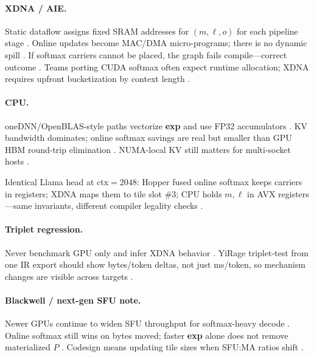 \paragraph{XDNA / AIE.} Static dataflow assigns fixed SRAM addresses for $(m,\ell,o)$ for each pipeline stage \citep{amd2024aie,amd2024xdna}. Online updates become MAC/DMA micro-programs; there is no dynamic spill \citep{yirage2026,chen2020compilerbasedhardw}. If softmax carriers cannot be placed, the graph fails compile---correct outcome \citep{amd2024aie,memoryfloor2026}. Teams porting CUDA softmax often expect runtime allocation; XDNA requires upfront bucketization by context length \citep{kwon2023vllm,amd2024xdna}.

\paragraph{CPU.} oneDNN/OpenBLAS-style paths vectorize \textbf{exp} and use FP32 accumulators \citep{dlbook}. KV bandwidth dominates; online softmax savings are real but smaller than GPU HBM round-trip elimination \citep{patel2025llminference,memoryfloor2026}. NUMA-local KV still matters for multi-socket hosts \citep{kwon2023vllm,dlbook}.

\begin{example}
Identical Llama head at ctx${=}2048$: Hopper fused online softmax keeps carriers in registers; XDNA maps them to tile slot \#3; CPU holds $m,\ell$ in AVX registers---same invariants, different compiler legality checks \citep{amd2024xdna,semianalysis2024tma,dlbook,yirage2026}.
\end{example}

\paragraph{Triplet regression.} Never benchmark GPU only and infer XDNA behavior \citep{amd2024aie,patel2025llminference}. YiRage triplet-test from one IR export should show bytes/token deltas, not just ms/token, so mechanism changes are visible across targets \citep{yirage2026,chen2020compilerbasedhardw,liu2024deepseekv3}.

\paragraph{Blackwell / next-gen SFU note.} Newer GPUs continue to widen SFU throughput for softmax-heavy decode \citep{nvidia2022hopper,patel2025llminference}. Online softmax still wins on bytes moved; faster \textbf{exp} alone does not remove materialized $P$ \citep{memoryfloor2026,dao2022flashattention}. Codesign means updating tile sizes when SFU:MA ratios shift \citep{semianalysis2024tma}.


